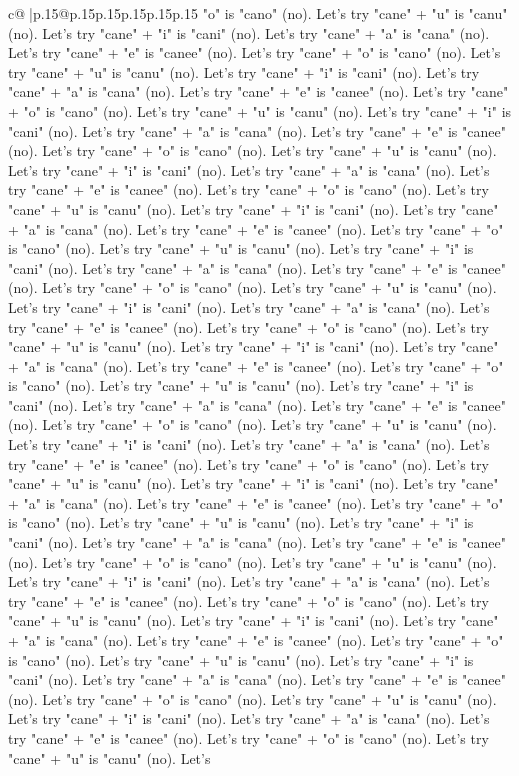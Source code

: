 \documentclass{article}
\begin{document}
{\begin{supertabular}{c@{$\;$}|p{.15\linewidth}@{}p{.15\linewidth}p{.15\linewidth}p{.15\linewidth}p{.15\linewidth}p{.15\linewidth}}
{{{"o" is "cano" (no). Let's try "cane" + "u" is "canu" (no). Let's try "cane" + "i" is "cani" (no). Let's try "cane" + "a" is "cana" (no). Let's try "cane" + "e" is "canee" (no). Let's try "cane" + "o" is "cano" (no). Let's try "cane" + "u" is "canu" (no). Let's try "cane" + "i" is "cani" (no). Let's try "cane" + "a" is "cana" (no). Let's try "cane" + "e" is "canee" (no). Let's try "cane" + "o" is "cano" (no). Let's try "cane" + "u" is "canu" (no). Let's try "cane" + "i" is "cani" (no). Let's try "cane" + "a" is "cana" (no). Let's try "cane" + "e" is "canee" (no). Let's try "cane" + "o" is "cano" (no). Let's try "cane" + "u" is "canu" (no). Let's try "cane" + "i" is "cani" (no). Let's try "cane" + "a" is "cana" (no). Let's try "cane" + "e" is "canee" (no). Let's try "cane" + "o" is "cano" (no). Let's try "cane" + "u" is "canu" (no). Let's try "cane" + "i" is "cani" (no). Let's try "cane" + "a" is "cana" (no). Let's try "cane" + "e" is "canee" (no). Let's try "cane" + "o" is "cano" (no). Let's try "cane" + "u" is "canu" (no). Let's try "cane" + "i" is "cani" (no). Let's try "cane" + "a" is "cana" (no). Let's try "cane" + "e" is "canee" (no). Let's try "cane" + "o" is "cano" (no). Let's try "cane" + "u" is "canu" (no). Let's try "cane" + "i" is "cani" (no). Let's try "cane" + "a" is "cana" (no). Let's try "cane" + "e" is "canee" (no). Let's try "cane" + "o" is "cano" (no). Let's try "cane" + "u" is "canu" (no). Let's try "cane" + "i" is "cani" (no). Let's try "cane" + "a" is "cana" (no). Let's try "cane" + "e" is "canee" (no). Let's try "cane" + "o" is "cano" (no). Let's try "cane" + "u" is "canu" (no). Let's try "cane" + "i" is "cani" (no). Let's try "cane" + "a" is "cana" (no). Let's try "cane" + "e" is "canee" (no). Let's try "cane" + "o" is "cano" (no). Let's try "cane" + "u" is "canu" (no). Let's try "cane" + "i" is "cani" (no). Let's try "cane" + "a" is "cana" (no). Let's try "cane" + "e" is "canee" (no). Let's try "cane" + "o" is "cano" (no). Let's try "cane" + "u" is "canu" (no). Let's try "cane" + "i" is "cani" (no). Let's try "cane" + "a" is "cana" (no). Let's try "cane" + "e" is "canee" (no). Let's try "cane" + "o" is "cano" (no). Let's try "cane" + "u" is "canu" (no). Let's try "cane" + "i" is "cani" (no). Let's try "cane" + "a" is "cana" (no). Let's try "cane" + "e" is "canee" (no). Let's try "cane" + "o" is "cano" (no). Let's try "cane" + "u" is "canu" (no). Let's try "cane" + "i" is "cani" (no). Let's try "cane" + "a" is "cana" (no). Let's try "cane" + "e" is "canee" (no). Let's try "cane" + "o" is "cano" (no). Let's try "cane" + "u" is "canu" (no). Let's try "cane" + "i" is "cani" (no). Let's try "cane" + "a" is "cana" (no). Let's try "cane" + "e" is "canee" (no). Let's try "cane" + "o" is "cano" (no). Let's try "cane" + "u" is "canu" (no). Let's try "cane" + "i" is "cani" (no). Let's try "cane" + "a" is "cana" (no). Let's try "cane" + "e" is "canee" (no). Let's try "cane" + "o" is "cano" (no). Let's try "cane" + "u" is "canu" (no). Let's try "cane" + "i" is "cani" (no). Let's try "cane" + "a" is "cana" (no). Let's try "cane" + "e" is "canee" (no). Let's try "cane" + "o" is "cano" (no). Let's try "cane" + "u" is "canu" (no). Let's }}}
\end{supertabular}}
\end{document}
